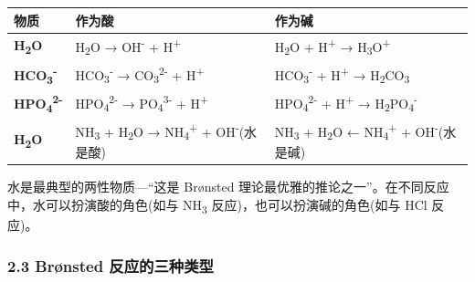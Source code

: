 \documentclass[a4paper,11pt]{ctexart}
\newcounter{none}
\begin{document}
{\def\LTcaptype{none} %
\begin{longtable}[]{@{}
  >{\raggedright\arraybackslash}p{}
  >{\raggedright\arraybackslash}p{}
  >{\raggedright\arraybackslash}p{}@{}}
\toprule\noalign{}
\begin{minipage}[b]{\linewidth}\raggedright
物质
\end{minipage} & \begin{minipage}[b]{\linewidth}\raggedright
作为酸
\end{minipage} & \begin{minipage}[b]{\linewidth}\raggedright
作为碱
\end{minipage} \\
\midrule\noalign{}
\endhead
\bottomrule\noalign{}
\endlastfoot
\textbf{H\textsubscript{2}O} & H\textsubscript{2}O → OH\textsuperscript{-} + H\textsuperscript{+} & H\textsubscript{2}O + H\textsuperscript{+} → H\textsubscript{3}O\textsuperscript{+} \\
\textbf{HCO\textsubscript{3}\textsuperscript{-}} & HCO\textsubscript{3}\textsuperscript{-} → CO\textsubscript{3}\textsuperscript{2-} + H\textsuperscript{+} & HCO\textsubscript{3}\textsuperscript{-} + H\textsuperscript{+} → H\textsubscript{2}CO\textsubscript{3} \\
\textbf{HPO\textsubscript{4}\textsuperscript{2-}} & HPO\textsubscript{4}\textsuperscript{2-} → PO\textsubscript{4}\textsuperscript{3-} + H\textsuperscript{+} & HPO\textsubscript{4}\textsuperscript{2-} + H\textsuperscript{+} → H\textsubscript{2}PO\textsubscript{4}\textsuperscript{-} \\
\textbf{H\textsubscript{2}O} & NH\textsubscript{3} + H\textsubscript{2}O → NH\textsubscript{4}\textsuperscript{+} + OH\textsuperscript{-}(水是酸) & NH\textsubscript{3} + H\textsubscript{2}O ← NH\textsubscript{4}\textsuperscript{+} + OH\textsuperscript{-}(水是碱) \\
\end{longtable}
}

水是最典型的两性物质---``这是 Brønsted 理论最优雅的推论之一''。在不同反应中，水可以扮演酸的角色(如与 NH\textsubscript{3} 反应)，也可以扮演碱的角色(如与 HCl 反应)。

\subsubsection{2.3 Brønsted 反应的三种类型}\label{bruxf8nsted-ux53cdux5e94ux7684ux4e09ux79cdux7c7bux578b}
\end{document}
